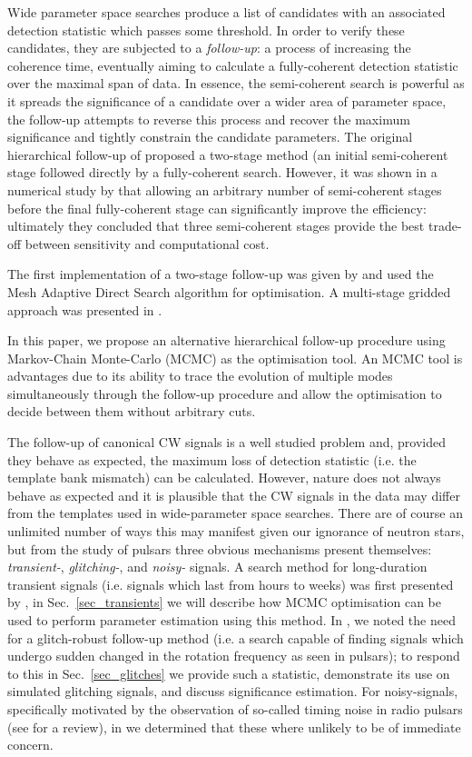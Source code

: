 \documentclass[aps, prd, twocolumn, superscriptaddress, floatfix, showpacs, nofootinbib, longbibliography]{revtex4-1}
\begin{document}
Wide parameter space searches produce a list of candidates with an associated
detection statistic which passes some threshold. In order to verify these
candidates, they are subjected to a \emph{follow-up}: a process of increasing
the coherence time, eventually aiming to calculate a fully-coherent detection
statistic over the maximal span of data. In essence, the semi-coherent search
is powerful as it spreads the significance of a candidate over a wider area of
parameter space, the follow-up attempts to reverse this process and recover
the maximum significance and tightly constrain the candidate parameters. The
original hierarchical follow-up of \citet{brady2000} proposed a two-stage method
(an initial semi-coherent  stage followed directly by a fully-coherent search.
However, it was shown in a numerical study by \citet{cutler2005} that allowing
an arbitrary number of semi-coherent stages before the final fully-coherent
stage can significantly improve the efficiency: ultimately they concluded that
three semi-coherent stages provide the best trade-off between sensitivity and
computational cost.

The first implementation of a two-stage follow-up was given by
\citet{shaltev2013} and used the Mesh Adaptive Direct Search algorithm for
optimisation. A multi-stage gridded approach was presented in \citet{Papa2016}.

In this paper, we propose an alternative hierarchical follow-up procedure using
Markov-Chain Monte-Carlo (MCMC) as the optimisation tool. An MCMC tool is
advantages due to its ability to trace the evolution of multiple modes
simultaneously through the follow-up procedure and allow the optimisation to
decide between them without arbitrary cuts.

The follow-up of canonical CW signals is a well studied problem and, provided
they behave as expected, the maximum loss of detection statistic (i.e. the
template bank mismatch) can be calculated. However, nature does not always
behave as expected and it is plausible that the CW signals in the data may
differ from the templates used in wide-parameter space searches. There are of
course an unlimited number of ways this may manifest given our ignorance of
neutron stars, but from the study of pulsars three obvious mechanisms present
themselves: \emph{transient-}, \emph{glitching-}, and \emph{noisy-} signals.
A search method for long-duration transient signals (i.e. signals which
last from hours to weeks) was first presented by
\citet{prix2011}, in Sec.~\ref{sec_transients} we will describe how MCMC
optimisation can be used to perform parameter estimation using this method.
In \citet{ashton2017}, we noted the need for a glitch-robust follow-up method
(i.e. a search capable of finding signals which undergo sudden changed in the
rotation frequency as seen in pulsars); to respond to this in Sec.~\ref{sec_glitches}
we provide such a statistic, demonstrate its use on simulated glitching
signals, and discuss significance estimation. For noisy-signals, specifically
motivated by the observation of so-called timing noise in radio pulsars (see
\citet{hobbs2010} for a review), in \citet{ashton2015} we determined that these
where unlikely to be of immediate concern.
\end{document}
